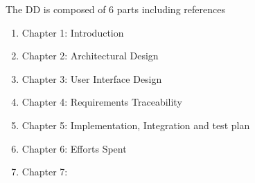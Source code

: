 \qquad The DD is composed of 6 parts including references
\begin{enumerate}
\item Chapter 1: Introduction
\item Chapter 2: Architectural Design
\item Chapter 3: User Interface Design
\item Chapter 4: Requirements Traceability
\item Chapter 5: Implementation, Integration and test plan
\item Chapter 6: Efforts Spent
\item Chapter 7:
\end{enumerate}
